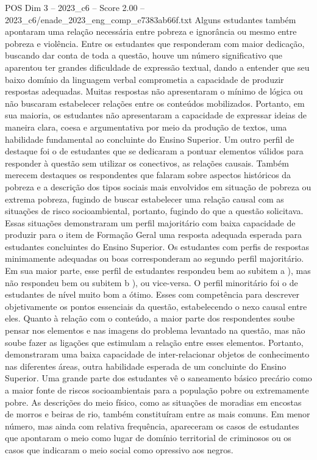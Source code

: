 \begin{textsample}{POS Dim 3 – 2023\_c6 – Score 2.00 – 2023\_c6/enade\_2023\_eng\_comp\_e7383ab66f.txt}
Alguns estudantes também apontaram uma relação necessária entre pobreza e ignorância ou mesmo entre pobreza e violência.
Entre os estudantes que responderam com maior dedicação, buscando dar conta de toda a questão, houve um número significativo que aparentou ter grandes dificuldade de expressão textual, dando a entender que seu baixo domínio da linguagem verbal comprometia a capacidade de produzir respostas adequadas.
Muitas respostas não apresentaram o mínimo de lógica ou não buscaram estabelecer relações entre os conteúdos mobilizados.
Portanto, em sua maioria, os estudantes não apresentaram a capacidade de expressar ideias de maneira clara, coesa e argumentativa por meio da produção de textos, uma habilidade fundamental ao concluinte do Ensino Superior.
Um outro perfil de destaque foi o de estudantes que se dedicaram a pontuar elementos válidos para responder à questão sem utilizar os conectivos, as relações causais.
Também merecem destaques os respondentes que falaram sobre aspectos históricos da pobreza e a descrição dos tipos sociais mais envolvidos em situação de pobreza ou extrema pobreza, fugindo de buscar estabelecer uma relação causal com as situações de risco socioambiental, portanto, fugindo do que a questão solicitava.
Essas situações demonstraram um perfil majoritário com baixa capacidade de produzir para o item de Formação Geral uma resposta adequada esperada para estudantes concluintes do Ensino Superior.
Os estudantes com perfis de respostas minimamente adequadas ou boas corresponderam ao segundo perfil majoritário.
Em sua maior parte, esse perfil de estudantes respondeu bem ao subitem a ), mas não respondeu bem ou subitem b ), ou vice-versa.
O perfil minoritário foi o de estudantes de nível muito bom a ótimo.
Esses com competência para descrever objetivamente os pontos essenciais da questão, estabelecendo o nexo causal entre eles.
Quanto à relação com o conteúdo, a maior parte dos respondentes soube pensar nos elementos e nas imagens do problema levantado na questão, mas não soube fazer as ligações que estimulam a relação entre esses elementos.
Portanto, demonstraram uma baixa capacidade de inter-relacionar objetos de conhecimento nas diferentes áreas, outra habilidade esperada de um concluinte do Ensino Superior.
Uma grande parte dos estudantes vê o saneamento básico precário como a maior fonte de riscos socioambientais para a população pobre ou extremamente pobre.
As descrições do meio físico, como as situações de moradias em encostas de morros e beiras de rio, também constituíram entre as mais comuns.
Em menor número, mas ainda com relativa frequência, apareceram os casos de estudantes que apontaram o meio como lugar de domínio territorial de criminosos ou os casos que indicaram o meio social como opressivo aos negros.

\end{textsample}
